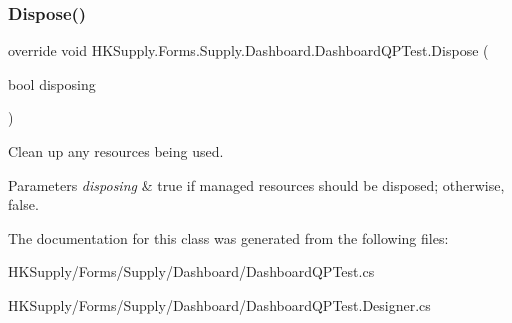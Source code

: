 \subsubsection{\texorpdfstring{Dispose()}{Dispose()}}
{\footnotesize\ttfamily override void H\+K\+Supply.\+Forms.\+Supply.\+Dashboard.\+Dashboard\+Q\+P\+Test.\+Dispose (\begin{DoxyParamCaption}\item[{bool}]{disposing }\end{DoxyParamCaption})\hspace{0.3cm}{\ttfamily [protected]}}



Clean up any resources being used. 


\begin{DoxyParams}{Parameters}
{\em disposing} & true if managed resources should be disposed; otherwise, false.\\
\hline
\end{DoxyParams}


The documentation for this class was generated from the following files\+:\begin{DoxyCompactItemize}
\item 
H\+K\+Supply/\+Forms/\+Supply/\+Dashboard/Dashboard\+Q\+P\+Test.\+cs\item 
H\+K\+Supply/\+Forms/\+Supply/\+Dashboard/Dashboard\+Q\+P\+Test.\+Designer.\+cs\end{DoxyCompactItemize}
